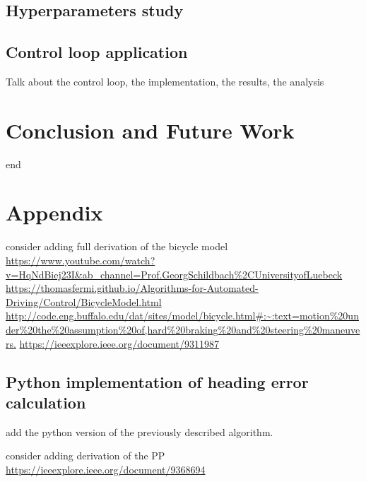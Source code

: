 \documentclass[a4paper,12pt,sort&compress]{article}
\begin{document}
\clearpage

\subsection{Hyperparameters study}





\subsection{Control loop application}
    Talk about the control loop, the implementation, the results, the analysis





\newpage
\section{Conclusion and Future Work}
end




\newpage
\section{Appendix}
consider adding full derivation of the bicycle model \url{https://www.youtube.com/watch?v=HqNdBiej23I&ab_channel=Prof.GeorgSchildbach%2CUniversityofLuebeck}
\url{https://thomasfermi.github.io/Algorithms-for-Automated-Driving/Control/BicycleModel.html}
\url{http://code.eng.buffalo.edu/dat/sites/model/bicycle.html#:~:text=motion%20under%20the%20assumption%20of,hard%20braking%20and%20steering%20maneuvers.}
\url{https://ieeexplore.ieee.org/document/9311987}

\subsection{Python implementation of heading error calculation}
add the python version of the previously described algorithm.

consider adding derivation of the PP
\url{https://ieeexplore.ieee.org/document/9368694}


\newpage
\end{document}
